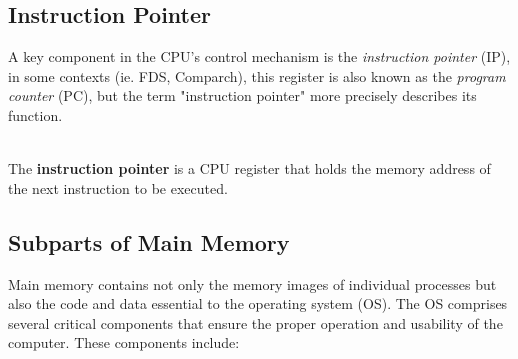 \subsection{Instruction Pointer}
A key component in the CPU's control mechanism is the \emph{instruction pointer} (IP), in some contexts (ie. FDS, Comparch), this register is also known as the \emph{program counter} (PC), but the term "instruction pointer" more precisely describes its function.
\vspace{10px}
\begin{definition}
\leavevmode\\[5px]
The \textbf{instruction pointer} is a CPU register that holds the memory address of the next instruction to be executed.
\end{definition}
\vspace{5px}
\subsection{Subparts of Main Memory}
Main memory contains not only the memory images of individual processes but also the code and data essential to the operating system (OS). The OS comprises several critical components that ensure the proper operation and usability of the computer. These components include:

